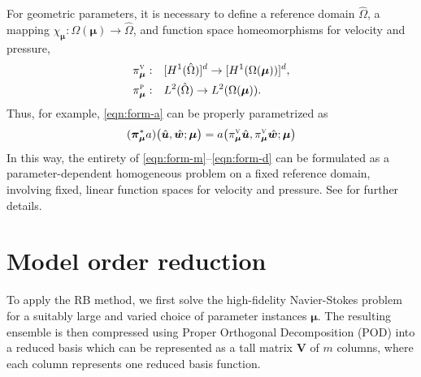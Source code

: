 \documentclass[a4paper]{jpconf}
\begin{document}
For geometric parameters, it is necessary to define a reference domain
$\hat{\Omega}$, a mapping
$\chi_{\bm \mu} : \Omega(\bm \mu) \to\hat{\Omega}$,
and function space homeomorphisms for velocity and pressure,
\begin{align}
  \label{eqn:trf-v}
  {\pi}_{\bm\mu}^\textsc{v}:& \quad [H^1(\hat{\Omega})]^d\to{}[H^1(\Omega(\bm \mu))]^d, \\
  {\pi}_{\bm\mu}^\textsc{p}:& \quad L^2(\hat{\Omega})\to{}L^2(\Omega(\bm{\mu})).
\end{align}
Thus, for example, \eqref{eqn:form-a} can be properly parametrized as
\begin{equation}
  ({\bm\pi}^*_{\bm\mu}a)\big(\hat{\bm{u}},\hat{\bm{w}};\bm{\mu}\big) =
  a\big({\pi}_{\bm\mu}^\textsc{v}\hat{\bm{u}},{\pi}_{\bm\mu}^\textsc{v}\hat{\bm{w}};\bm{\mu}\big)
\end{equation}
In this way, the entirety of \eqref{eqn:form-m}--\eqref{eqn:form-d}
can be formulated as a parameter-dependent homogeneous problem on a
fixed reference domain, involving fixed, linear function spaces for
velocity and pressure.  See \cite{Fonn2018fdc} for further details.

\section{Model order reduction}

To apply the RB method, we first solve the high-fidelity Navier-Stokes
problem for a suitably large and varied choice of parameter instances
$\bm \mu$.  The resulting ensemble is then compressed using Proper
Orthogonal Decomposition (POD) \cite{Chatterjee2000ipo} into a reduced
basis which can be represented as a tall matrix $\bm V$ of $m$
columns, where each column represents one reduced basis function.
\end{document}

